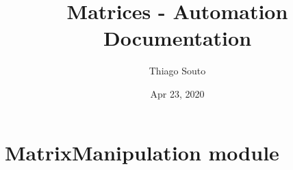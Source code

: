 \documentclass[letterpaper,10pt,english]{sphinxmanual}
\title{Matrices - Automation Documentation}
\date{Apr 23, 2020}
\author{Thiago Souto}
\begin{document}
\maketitle
\sphinxtableofcontents
{}\label{\detokenize{index::doc}}



\chapter{MatrixManipulation module}
\label{\detokenize{rst/MatrixManipulation::doc}}\label{\detokenize{rst/MatrixManipulation:welcome-to-matrices-automation-s-documentation}}\label{\detokenize{rst/MatrixManipulation:matrixmanipulation-module}}\label{\detokenize{rst/MatrixManipulation:module-MatrixManipulation}}
\end{document}

